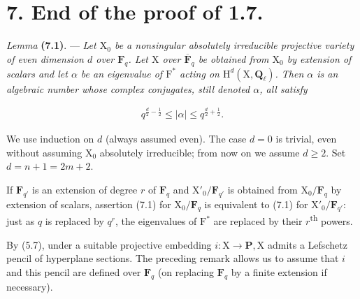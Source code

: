 \documentclass[10pt,leqno]{article}
\begin{document}
\section*{7. End of the proof of 1.7.}

\noindent \emph{Lemma} \textbf{(7.1)}. — {\itshape Let \(\mathrm{X}_{0}\) be a nonsingular absolutely irreducible projective variety of \textup{even} dimension \(d\) over \(\mathbf{F}_{q}\). Let \(\mathrm{X}\) over \(\overline{\mathbf{F}}_{q}\) be obtained from \(\mathrm{X}_{0}\) by extension of scalars and let \(\alpha \) be an eigenvalue of \(\mathrm{F}^{*}\) acting on \(\mathrm{H}^{d}(\mathrm{X},\mathbf{Q}_{\ell })\). Then \(\alpha \) is an algebraic number whose complex conjugates, still denoted \(\alpha \), all satisfy}\par

\begin{equation*}\begin{gathered}q^{\frac{d}{2}- \frac{1}{2}} \leq  |\alpha | \leq  q^{\frac{d}{2}+\frac{1}{2}}.\end{gathered}\tag{7.1.1}\end{equation*}

\noindent We use induction on \(d\) (always assumed even). The case \(d=0\) is trivial, even without assuming \(\mathrm{X}_{0}\) absolutely irreducible; from now on we assume \(d\geq 2\). Set \(d=n+1=2m+2\).\par

\clearpage

\label{physical-28}\setcounter{page}{299}

\noindent If \(\mathbf{F}_{q'}\) is an extension of degree \(r\) of \(\mathbf{F}_{q}\) and \(\mathrm{X}'_{0}/\mathbf{F}_{q'}\) is obtained from \(\mathrm{X}_{0}/\mathbf{F}_{q}\) by extension of scalars, assertion (7.1) for \(\mathrm{X}_{0}/\mathbf{F}_{q}\) is equivalent to (7.1) for \(\mathrm{X}'_{0}/\mathbf{F}_{q'}\): just as \(q\) is replaced by \(q^{r}\), the eigenvalues of \(\mathrm{F}^{*}\) are replaced by their \(r\)\textsuperscript{th} powers.\par

\noindent By (5.7), under a suitable projective embedding \(i:\mathrm{X}\longrightarrow \mathbf{P}, \mathrm{X}\) admits a Lefschetz pencil of hyperplane sections. The preceding remark allows us to assume that \(i\) and this pencil are defined over \(\mathbf{F}_{q}\) (on replacing \(\mathbf{F}_{q}\) by a finite extension if necessary).\par
\end{document}
